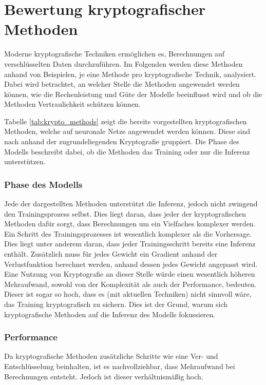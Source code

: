 \section{Bewertung kryptografischer Methoden}\label{sec:bw_krypto}

Moderne kryptografische Techniken ermöglichen es, Berechnungen auf verschlüsselten Daten durchzuführen.
Im Folgenden werden diese Methoden anhand von Beispielen, je eine Methode pro kryptografische Technik, analysiert.
Dabei wird betrachtet, an welcher Stelle die Methoden angewendet werden können, wie die Rechenleistung und Güte der Modelle beeinflusst wird und ob die Methoden Vertraulichkeit schützen können.

Tabelle \ref{tab:krypto_methods} zeigt die bereits vorgestellten kryptografischen Methoden, welche auf neuronale Netze angewendet werden können.
Diese sind nach anhand der zugrundeliegenden Kryptografie gruppiert.
Die Phase des Modells beschreibt dabei, ob die Methoden das Training oder nur die Inferenz unterstützen.




\subsubsection*{Phase des Modells}

Jede der dargestellten Methoden unterstützt die Inferenz, jedoch nicht zwingend den Trainingsprozess selbst.
Dies liegt daran, dass jeder der kryptografischen Methoden dafür sorgt, dass Berechnungen um ein Vielfaches komplexer werden. 
Ein Schritt des Trainingsprozesses ist wesentlich komplexer als die Vorhersage. 
Dies liegt unter anderem daran, dass jeder Trainingsschritt bereits eine Inferenz enthält.
Zusätzlich muss für jedes Gewicht ein Gradient anhand der Verlustfunktion berechnet werden, anhand dessen jedes Gewicht angepasst wird.
Eine Nutzung von Kryptografie an dieser Stelle würde einen wesentlich höheren Mehraufwand, sowohl von der Komplexität als auch der Performance, bedeuten.
Dieser ist sogar so hoch, dass es (mit aktuellen Techniken) nicht sinnvoll wäre, das Training kryptografisch zu sichern.
Dies ist der Grund, warum sich kryptografische Methoden auf die Inferenz des Modells fokussieren.

\subsubsection*{Performance}

Da kryptografische Methoden zusätzliche Schritte wie eine Ver- und Entschlüsselung beinhalten, ist es nachvollziehbar, dass Mehraufwand bei Berechnungen entsteht.
Jedoch ist dieser verhältnismäßig hoch.

